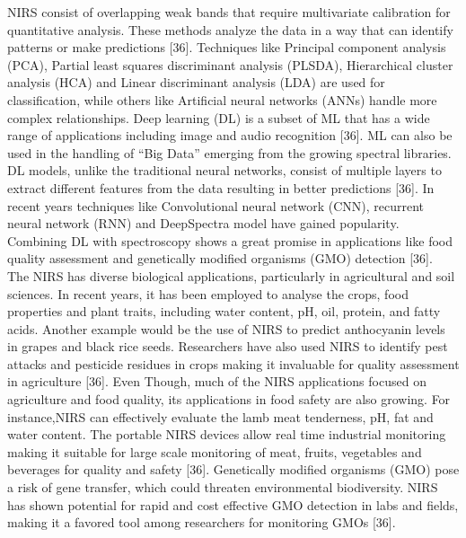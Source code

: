\documentclass[12pt,a4paper]{article}
\begin{document}
NIRS consist of overlapping weak bands that require multivariate calibration for quantitative analysis. These methods analyze the data in a way that can identify patterns or make predictions [36]. Techniques like Principal component analysis (PCA), Partial least squares discriminant analysis (PLSDA), Hierarchical cluster analysis (HCA) and Linear discriminant analysis (LDA) are used for classification, while others like Artificial neural networks (ANNs) handle more complex relationships. 
Deep learning (DL) is a subset of ML that has a wide range of applications including image and audio recognition [36]. ML can also be used in the handling of “Big Data” emerging from the growing spectral libraries. DL models, unlike the traditional neural networks, consist of multiple layers to extract different features from the data resulting in better predictions [36]. In recent years techniques like Convolutional neural network (CNN), recurrent neural network (RNN) and DeepSpectra 
model have gained popularity. Combining DL with spectroscopy shows a great promise in applications like food quality assessment and genetically modified organisms (GMO) detection [36].\\

The NIRS has diverse biological applications, particularly in agricultural and soil sciences. In recent years, it has been employed to analyse the crops, food properties and plant traits, including water content, pH, oil, protein, and fatty acids. Another example would be the use of NIRS to predict anthocyanin levels in grapes and black rice seeds. Researchers have also used NIRS to identify pest attacks and pesticide residues in crops making it invaluable for quality assessment 
in agriculture [36]. Even Though, much of the NIRS applications focused on agriculture and food quality, its applications in food safety are also growing. For instance,NIRS can effectively evaluate the lamb meat tenderness, pH, fat and water content. The portable NIRS devices allow real time industrial monitoring making it suitable for large scale monitoring of meat, fruits, vegetables and beverages for quality and safety [36]. Genetically modified organisms (GMO) pose a risk of 
gene transfer, which could threaten environmental biodiversity. NIRS has shown potential for rapid and cost effective GMO detection in labs and fields, making it a favored tool among researchers for monitoring GMOs [36]. \\
\end{document}
